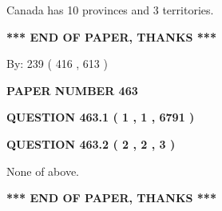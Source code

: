 \documentclass[12pt]{article}
\begin{document}
 
Canada has 10  provinces and 3 territories.
 
 
 
 
   
   
 \vspace{0.2in}
 
   
   
   
   
\vspace{1.0in} 
{\textbf{\large{ *** END OF PAPER, THANKS *** }}} 
   
   
\hspace{1.0in} By: 
 239 ( 416 ,  613 )
   
   
   
   
\newpage 
\setcounter{page}{ 
   463001 } 
   
   
   
   
 {\textbf{ \Large{ PAPER NUMBER  463  }}}
   
   
\vspace{0.2in}
   
   
   
   
   
   
 \vspace{0.2in}
 
 
 
 
   
   
  
\vspace{0.2in}
  
{\textbf{\Large{QUESTION
463.1 
 ( 1 , 1 , 6791 )
}}}
  
  
  
\vspace{0.2in}
  
{\textbf{\Large{QUESTION
463.2 
 ( 2 , 2 , 3 )
}}}
  
  
 
 
\noindent{}
 
 
 None of above.
 
 
 
 
   
   
 \vspace{0.2in}
 
   
   
   
   
\vspace{1.0in} 
{\textbf{\large{ *** END OF PAPER, THANKS *** }}} 
   
\end{document}
